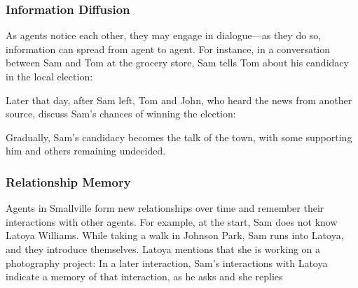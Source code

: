 \subsubsection{Information Diffusion} 
As agents notice each other, they may engage in dialogue---as they do so, information can spread from agent to agent. For instance, in a conversation between Sam and Tom at the grocery store, Sam tells Tom about his candidacy in the local election:
\begin{quote}
\end{quote}
Later that day, after Sam left, Tom and John, who heard the news from another source, discuss Sam's chances of winning the election:
\begin{quote}
\end{quote}
Gradually, Sam's candidacy becomes the talk of the town, with some supporting him and others remaining undecided. 

\subsubsection{Relationship Memory} 
Agents in Smallville form new relationships over time and remember their interactions with other agents. For example, at the start, Sam does not know Latoya Williams. While taking a walk in Johnson Park, Sam runs into Latoya, and they introduce themselves. Latoya mentions that she is working on a photography project:  In a later interaction, Sam's interactions with Latoya indicate a memory of that interaction, as he asks  and she replies 

